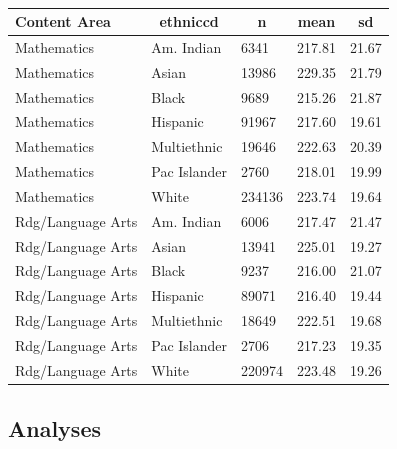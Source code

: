 \documentclass[man, fleqn, noextraspace]{apa6}
\theoremstyle{definition}
\theoremstyle{definition}
\theoremstyle{definition}
\theoremstyle{remark}
\begin{document}
\begin{table}[tbp]
\begin{center}
\begin{threeparttable}
\caption{\label{tab:descrips}}
\begin{tabular}{lllll}
\toprule
Content Area & \multicolumn{1}{c}{ethniccd} & \multicolumn{1}{c}{n} & \multicolumn{1}{c}{mean} & \multicolumn{1}{c}{sd}\\
\midrule
Mathematics & Am. Indian & 6341 & 217.81 & 21.67\\
Mathematics & Asian & 13986 & 229.35 & 21.79\\
Mathematics & Black & 9689 & 215.26 & 21.87\\
Mathematics & Hispanic & 91967 & 217.60 & 19.61\\
Mathematics & Multiethnic & 19646 & 222.63 & 20.39\\
Mathematics & Pac Islander & 2760 & 218.01 & 19.99\\
Mathematics & White & 234136 & 223.74 & 19.64\\
Rdg/Language Arts & Am. Indian & 6006 & 217.47 & 21.47\\
Rdg/Language Arts & Asian & 13941 & 225.01 & 19.27\\
Rdg/Language Arts & Black & 9237 & 216.00 & 21.07\\
Rdg/Language Arts & Hispanic & 89071 & 216.40 & 19.44\\
Rdg/Language Arts & Multiethnic & 18649 & 222.51 & 19.68\\
Rdg/Language Arts & Pac Islander & 2706 & 217.23 & 19.35\\
Rdg/Language Arts & White & 220974 & 223.48 & 19.26\\
\bottomrule
\end{tabular}
\end{threeparttable}
\end{center}
\end{table}

\hypertarget{analyses}{%
\subsection{Analyses}\label{analyses}}
\end{document}
